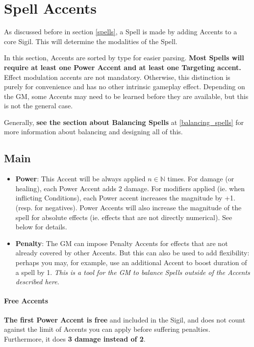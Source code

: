 \section{Spell Accents}
\label{spell_accents}

As discussed before in section \ref{spells}, a Spell is made by adding Accents to a core Sigil. This will determine the modalities of the Spell.

In this section, Accents are sorted by type for easier parsing. \textbf{Most Spells will require at least one Power Accent and at least one Targeting accent.} Effect modulation accents are not mandatory. Otherwise, this distinction is purely for convenience and has no other intrinsic gameplay effect. Depending on the GM, some Accents may need to be learned before they are available, but this is not the general case.

Generally, \textbf{see the section about Balancing Spells} at \ref{balancing_spells} for more information about balancing and designing all of this.

\subsection{Main}

\begin{itemize}
    \item \textbf{Power}: This Accent will be always applied $n \in \mathds{N}$ times. For damage (or healing), each Power Accent adds 2 damage. For modifiers applied (ie. when inflicting Conditions), each Power accent increases the magnitude by +1. (resp. for negatives). Power Accents will also increase the magnitude of the spell for absolute effects (ie. effects that are not directly numerical). See below for details.
    \item \textbf{Penalty}: The GM can impose Penalty Accents for effects that are not already covered by other Accents. But this can also be used to add flexibility: perhaps you may, for example, use an additional Accent to boost duration of a spell by 1. \textit{This is a tool for the GM to balance Spells outside of the Accents described here.}
\end{itemize}

\paragraph{Free Accents}

\textbf{The first Power Accent is free} and included in the Sigil, and does not count against the limit of Accents you can apply before suffering penalties. Furthermore, it does \textbf{3 damage instead of 2}.

